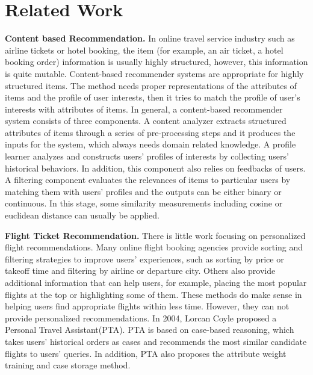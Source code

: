 \documentclass{llncs}
\begin{document}
\section{Related Work}\par
\label{sec:relw}
\textbf{Content based Recommendation.} In online travel service industry such as airline tickets or hotel booking, the item (for example, an air ticket, a hotel booking order) information is usually highly structured, however, this information is quite mutable. Content-based recommender systems \cite{tech:cset}\cite{lops:handbook}are appropriate for highly structured items. The method needs proper representations of the attributes of items and the profile of user interests, then it tries to match  the profile of user's interests with attributes of items. In general, a content-based recommender system consists of three components. A content analyzer extracts structured attributes of items through a series of pre-processing steps and it produces the inputs for the system, which always needs domain related knowledge. A profile learner analyzes and constructs users' profiles of interests by collecting users' historical behaviors. In addition, this component also relies on feedbacks of users. A filtering component evaluates the relevances of items to particular users by matching them with users' profiles and the outputs can be either binary or continuous. In this stage, some similarity measurements including cosine or euclidean distance can usually be applied.\par
\textbf{Flight Ticket Recommendation.} There is little work focusing on personalized flight  recommendations. Many online flight booking agencies provide sorting and filtering strategies to improve users' experiences, such as sorting by price or takeoff time and filtering by airline or departure city. Others also provide additional information that can help users, for example, placing the most popular flights at the top or highlighting some of them. These methods do make sense in helping users find appropriate flights within less time. However, they can not provide personalized recommendations. In 2004, Lorcan Coyle\cite{lor:flight} proposed a Personal Travel Assistant(PTA). PTA is based on case-based reasoning, which takes users' historical orders as cases and recommends the most similar candidate flights to users' queries. In addition, PTA also proposes the attribute weight training and case storage method.\par
\end{document}
